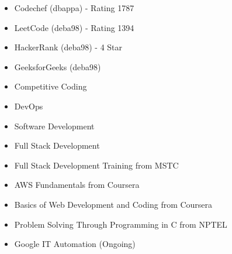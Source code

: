 


\normalsize{}



\begin{itemize}
\item\linespread{1.4} \large{Codechef (dbappa) - Rating 1787}
\item LeetCode (deba98) - Rating 1394
\item HackerRank (deba98) - 4 Star
\item GeeksforGeeks (deba98)

\end{itemize}


\begin{itemize}
\item\linespread{1.4} \large{ Competitive Coding}
\item DevOps
\item Software Development
\item Full Stack Development

\end{itemize}
 

\begin{itemize}
\item\linespread{1.2} \large Full Stack Development Training from MSTC
\item AWS Fundamentals from Coursera
\item Basics of Web Development and Coding from Coursera
\item Problem Solving Through Programming in C from NPTEL
\item Google IT Automation (Ongoing)
\end{itemize}










